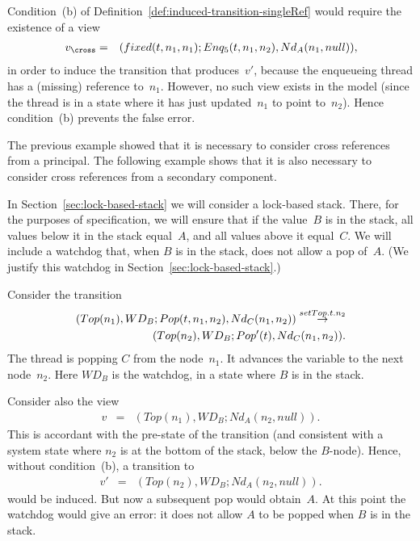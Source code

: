 Condition~(b) of Definition~\ref{def:induced-transition-singleRef} would
require the existence of a view
\begin{eqnarray*}
v_\cross & = & (fixed(t, n_1, n_1); Enq_5(t, n_1, n_2), Nd_A(n_1, null)),
\end{eqnarray*}
in order to induce the transition that produces~$v'$, because the enqueueing
thread has a (missing) reference to~$n_1$.  However, no such view exists in
the model (since the thread is in a state where it has just updated~$n_1$ to
point to~$n_2$).  Hence condition~(b) prevents the false error.


The previous example showed that it is necessary to consider cross references
from a principal.  The following example shows that it is also necessary to
consider cross references from a secondary component.  

In Section~\ref{sec:lock-based-stack} we will consider a lock-based stack.
There, for the purposes of specification, we will ensure that if the value~$B$
is in the stack, all values below it in the stack equal~$A$, and all values
above it equal~$C$.  We will include a watchdog that, when $B$ is in the
stack, does not allow a pop of~$A$.  (We justify this watchdog in
Section~\ref{sec:lock-based-stack}.) 

Consider the transition
\[
\begin{align}
(Top(n_1), WD_B ; Pop(t, n_1, n_2), Nd_C(n_1, n_2)) \stackrel{setTop.t.n_2}\rightarrow \\
\qquad  (Top(n_2), WD_B ; Pop'(t), Nd_C(n_1, n_2)) .
\end{align}
\]
The thread is popping $C$ from the node~$n_1$.  It advances the
 variable to the next node~$n_2$.  Here $WD_B$ is the watchdog, in
a state where $B$ is in the stack.  

Consider also the view
\begin{eqnarray*}
v & = & (Top(n_1), WD_B ;  Nd_A(n_2, null)).
\end{eqnarray*}
This is accordant with the pre-state of the transition (and consistent with a
system state where $n_2$ is at the bottom of the stack, below the $B$-node).
Hence, without condition~(b), a transition to
\begin{eqnarray*}
v' & = & (Top(n_2), WD_B ;  Nd_A(n_2, null)).
\end{eqnarray*}
would be induced.  But now a subsequent pop would obtain~$A$.  At this point
the watchdog would give an error: it does not allow $A$ to be popped when $B$
is in the stack.

